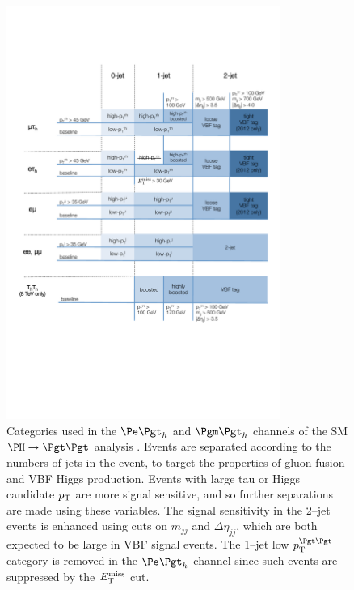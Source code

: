 \begin{figure}[htb]
\begin{center}
    \includegraphics[width=0.8\textwidth]
      {plots/htt-sm/categories_2012.pdf}
\end{center}
\caption[Categories used in the $\etau$ and $\mutau$ channels of the SM
 $\HToTauTau$ analysis.]{
 Categories used in the $\etau$ and $\mutau$ channels of the \ac{SM}
 $\HToTauTau$ analysis \cite{HIG-13-004}. Events are separated according to the
 numbers of jets in the event, to target the properties of gluon fusion and \ac{VBF}
 Higgs production. Events with large tau or Higgs candidate $p_{\mathrm{T}}$ are more
 signal sensitive, and so further separations are made using these variables.
 The signal sensitivity in the 2--jet events is enhanced using cuts on $m_{jj}$ and
 $\Delta\eta_{jj}$, which are both expected to be large in \ac{VBF} signal events.
 The 1--jet low $\pt^{\Pgt\Pgt}$ category is removed in the $\etau$ channel
 since such events are suppressed by the $E_{\mathrm{T}}^{\text{miss}}$ cut.   
}
\label{fig:smcategories}
\end{figure}

